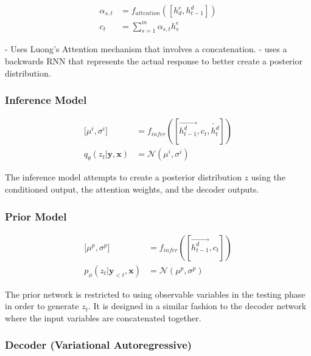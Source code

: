 \documentclass[12pt,twoside]{report}
\begin{document}
\begin{equation}
\label{eq:attn}
\begin{aligned}
	\alpha_{s,t} &= f_{attention}([h^e_d, h^d_{t-1}])\\        
	c_t &= \sum^m_{s=1}\alpha_{s,t} h^e_s
\end{aligned}
\end{equation}

- Uses Luong's Attention mechanism that involves a concatenation.
- uses a backwards RNN that represents the actual response to better create a posterior distribution.

\subsubsection{Inference Model}

\begin{equation}
\label{eq:t}
\begin{aligned}
\lbrack \mu^i, \sigma^i \rbrack &=
f_{infer}([\overrightarrow{h^d_{t-1}}, c_t, \overleftarrow{h^d_t}])
\\
q_{\theta}(z_t|\boldsymbol{y}, \boldsymbol{x}) &= \mathcal{N}(\mu^i, \sigma^i)
\end{aligned}
\end{equation}

The inference model attempts to create a posterior distribution $z$ using the conditioned output, the attention weights, and the decoder outputs.

\subsubsection{Prior Model}

\begin{equation}
\label{eq:t}
\begin{aligned}
\lbrack \mu^p, \sigma^p \rbrack &=
f_{infer}([\overrightarrow{h^d_{t-1}}, c_t])
\\
p_{\phi}(z_t|\boldsymbol{y}_{<t}, \boldsymbol{x}) &= \mathcal{N}(\mu^p, \sigma^p)
\end{aligned}
\end{equation}

The prior network is restricted to using observable variables in the testing phase in order to generate $z_t$. It is designed in a similar fashion to the decoder network where the input variables are concatenated together.

\subsubsection{Decoder (Variational Autoregressive)}
\end{document}
